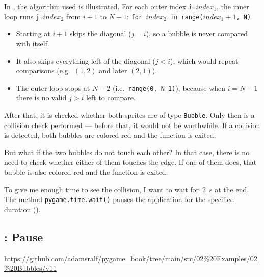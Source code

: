 In , the algorithm used is illustrated. For each outer index \texttt{i=$index_1$}, the inner loop runs \texttt{j=$index_2$} from $i+1$ to $N-1$: \texttt{for $index_2$ in range($index_1+1$, N)}

\begin{itemize}
	\item Starting at $i+1$ skips the diagonal ($j=i$), so a bubble is never compared with itself.
	\item It also skips everything left of the diagonal ($j<i$), which would repeat comparisons
	(e.g.\ $(1,2)$ and later $(2,1)$).
	\item The outer loop stops at $N-2$ (i.e.\ \texttt{range(0, N-1)}), because when $i=N-1$
	there is no valid $j>i$ left to compare.
\end{itemize}


After that, it is checked whether both sprites are of type \texttt{Bubble}. Only then is a collision check performed — before that, it would not be worthwhile. If a collision is detected, both bubbles are colored red and the function is exited.

But what if the two bubbles do not touch each other? In that case, there is no need to check whether either of them touches the edge. If one of them does, that bubble is also colored red and the function is exited.



To give me enough time to see the collision, I want to wait for~\SI{2}{s} at the end. The method \texttt{pygame.time.wait()} pauses the application for the specified duration ().



\newpage
\subsection{: Pause}
\begin{diskbox}
	\url{https://github.com/adamsralf/pygame_book/tree/main/src/02%20Examples/02%20Bubbles/v11}
\end{diskbox}

